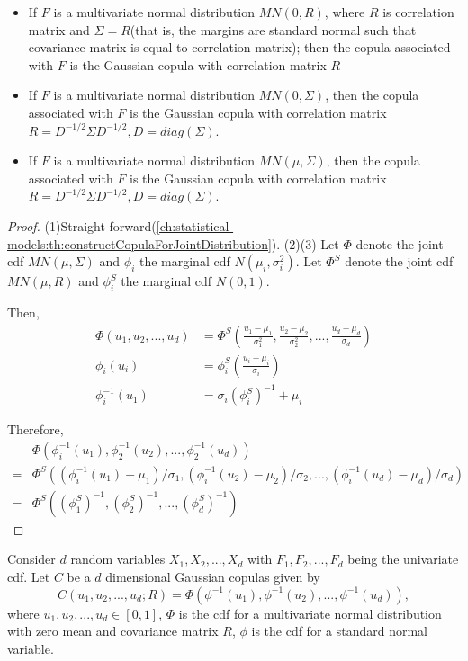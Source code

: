 \begin{refsection}
\begin{lemma}\label{ch:statistical-models:th:CopulaOfMultivariateGaussian}\hfill
\begin{itemize}
	\item If $F$ is a multivariate normal distribution $MN(0,R)$, where $R$ is correlation matrix and $\Sigma = R$(that is, the margins are standard normal such that covariance matrix is equal to correlation matrix); then the copula associated with $F$ is the Gaussian copula with correlation matrix $R$
	\item If $F$ is a multivariate normal distribution $MN(0,\Sigma)$, then the copula associated with $F$ is the Gaussian copula with correlation matrix $R = D^{-1/2}\Sigma D^{-1/2}, D = diag(\Sigma).$
	\item If $F$ is a multivariate normal distribution $MN(\mu,\Sigma)$, then the copula associated with $F$ is the Gaussian copula with correlation matrix $R = D^{-1/2}\Sigma D^{-1/2}, D = diag(\Sigma).$
\end{itemize}
\end{lemma}
\begin{proof}
(1)Straight forward(\autoref{ch:statistical-models:th:constructCopulaForJointDistribution}). 
(2)(3) Let $\Phi$ denote the joint cdf $MN(\mu, \Sigma)$ and $\phi_i$ the marginal cdf $N(\mu_i,\sigma_i^2)$.  Let $\Phi^S$ denote the joint cdf $MN(\mu, R)$ and $\phi_i^S$ the marginal cdf $N(0,1)$.

Then,
\begin{align*}
\Phi(u_1,u_2,...,u_d) &= \Phi^S(\frac{u_1 - \mu_1}{\sigma_1^2},\frac{u_2 - \mu_2}{\sigma_2^2},...,\frac{u_d - \mu_d}{\sigma_d}) \\
\phi_i(u_i) &= \phi^S_i(\frac{u_i - \mu_i}{\sigma_i}) \\
\phi_i^{-1}(u_1) &= \sigma_i(\phi^S_i)^{-1} + \mu_i 
\end{align*}

Therefore,
\begin{align*}
&\Phi(\phi^{-1}_i(u_1),\phi^{-1}_2(u_2),...,\phi^{-1}_2(u_d)) \\
=&\Phi^S((\phi^{-1}_i(u_1) - \mu_1)/\sigma_1,(\phi^{-1}_i(u_2) - \mu_2)/\sigma_2,...,(\phi^{-1}_i(u_d) - \mu_d)/\sigma_d) \\
=&\Phi^S((\phi^S_1)^{-1},(\phi^S_2)^{-1},...,(\phi^S_d)^{-1}) 
\end{align*}
\end{proof}


\begin{lemma}\label{ch:statistical-models:th:ConstructMultivariateCDFwithGaussianCopulaAndMargins}
	Consider $d$ random variables $X_1,X_2,...,X_d$ with $F_1,F_2,...,F_d$ being the univariate cdf.
	Let $C$ be a $d$ dimensional Gaussian copulas given by
	$$C(u_1,u_2,...,u_d; R) = \Phi(\phi^{-1}(u_1),\phi^{-1}(u_2),...,\phi^{-1}(u_d)),$$
	where $u_1,u_2,...,u_d \in [0,1]$, $\Phi$ is the cdf for a multivariate normal distribution with zero mean and covariance matrix $R$, $\phi$ is the cdf for a standard normal variable.
	

\end{lemma}
\end{refsection}
